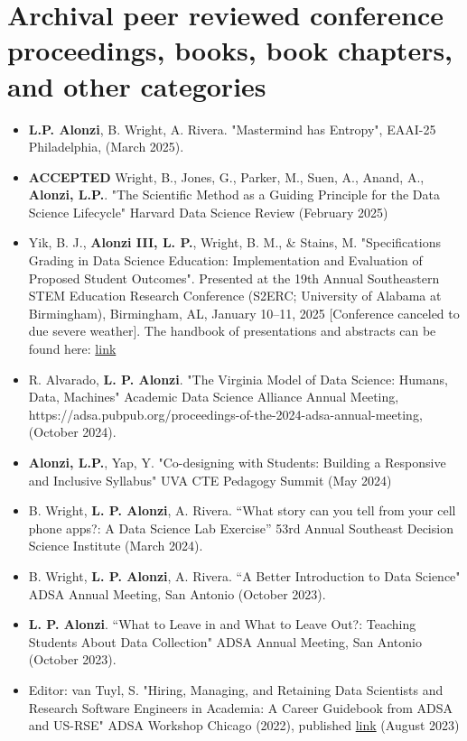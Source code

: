 \documentclass[10pt]{article}
\begin{document}
\section*{Archival peer reviewed conference proceedings, books, book chapters, and other categories}
\begin{itemize}
\item {\bf L.P. Alonzi}, B. Wright, A. Rivera. "Mastermind has Entropy", EAAI-25 Philadelphia, (March 2025).
\item {\bf ACCEPTED} Wright, B., Jones, G., Parker, M., Suen, A., Anand, A., {\bf Alonzi, L.P.}. "The Scientific Method as a Guiding Principle for the Data Science Lifecycle" Harvard Data Science Review (February 2025)
\item Yik, B. J., {\bf Alonzi III, L. P.}, Wright, B. M., \& Stains, M. "Specifications Grading in Data Science Education: Implementation and Evaluation of Proposed Student Outcomes". Presented at the 19th Annual Southeastern STEM Education Research Conference (S2ERC; University of Alabama at Birmingham), Birmingham, AL, January 10–11, 2025 [Conference canceled to due severe weather]. The handbook of presentations and abstracts can be found here: \href{https://tsec.mtsu.edu/wp-content/uploads/sites/67/2025/01/SSERC-2025-Program-Abstracts-1.pdf}{link}
\item R. Alvarado, {\bf L. P. Alonzi}. "The Virginia Model of Data Science: Humans, Data, Machines" Academic Data Science Alliance Annual Meeting, https://adsa.pubpub.org/proceedings-of-the-2024-adsa-annual-meeting, (October 2024).
\item {\bf Alonzi, L.P.}, Yap, Y. "Co-designing with Students: Building a Responsive and Inclusive Syllabus" UVA CTE Pedagogy Summit (May 2024)
\item B. Wright, {\bf L. P. Alonzi}, A. Rivera. “What story can you tell from your cell phone apps?: A Data Science Lab Exercise” 53rd Annual Southeast Decision Science Institute (March 2024).
\item B. Wright, {\bf L. P. Alonzi}, A. Rivera. “A Better Introduction to Data Science" ADSA Annual Meeting, San Antonio (October 2023).
\item {\bf L. P. Alonzi}. “What to Leave in and What to Leave Out?: Teaching Students About Data Collection" ADSA Annual Meeting, San Antonio (October 2023).
\item Editor: van Tuyl, S. "Hiring, Managing, and Retaining Data Scientists and Research Software Engineers in Academia: A Career Guidebook from ADSA and US-RSE" ADSA Workshop Chicago (2022), published \href{https://zenodo.org/records/8329337}{link} (August 2023)

\end{itemize}
\end{document}
